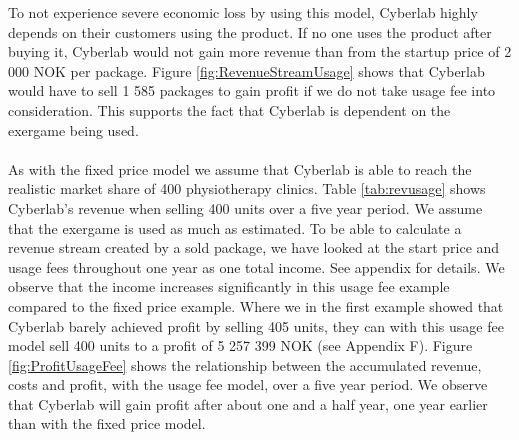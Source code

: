 To not experience severe economic loss by using this model, Cyberlab highly depends on their customers using the product. If no one uses the product after buying it, Cyberlab would not gain more revenue than from the startup price of 2 000 NOK per package. Figure \ref{fig:RevenueStreamUsage} shows that Cyberlab would have to sell 1 585 packages to gain profit if we do not take usage fee into consideration. This supports the fact that Cyberlab is dependent on the exergame being used. \\ \\
As with the fixed price model we assume that Cyberlab is able to reach the realistic market share of 400 physiotherapy clinics. Table \ref{tab:revusage} shows Cyberlab's revenue when selling 400 units over a five year period. We assume that the exergame is used as much as estimated. To be able to calculate a revenue stream created by a sold package, we have looked at the start price and usage fees throughout one year as one total income. See appendix for details. We observe that the income increases significantly in this usage fee example compared to the fixed price example. Where we in the first example showed that Cyberlab barely achieved profit by selling 405 units, they can with this usage fee model sell 400 units to a profit of 5 257 399 NOK (see Appendix F). Figure \ref{fig:ProfitUsageFee} shows the relationship between the accumulated revenue, costs and profit, with the usage fee model, over a five year period. We observe that Cyberlab will gain profit after about one and a half year, one year earlier than with the fixed price model. \\ \\

